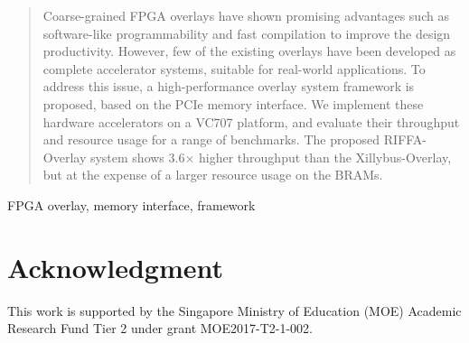 \documentclass[conference]{IEEEtran}
\begin{document}
\begin{abstract}
Coarse-grained FPGA overlays have shown promising advantages such as software-like programmability and fast compilation to improve the design productivity. 
However, few of the existing overlays have been developed as complete accelerator systems, suitable for real-world applications. 
To address this issue, a high-performance overlay system framework is proposed, based on the PCIe memory interface. 
We implement these hardware accelerators on a VC707 platform, and evaluate their throughput and resource usage for a range of benchmarks. 
The proposed RIFFA-Overlay system shows 3.6$\times$ higher throughput than the Xillybus-Overlay, but at the expense of a larger resource usage on the BRAMs. 
\end{abstract}

\begin{IEEEkeywords}
FPGA overlay, memory interface, framework
\end{IEEEkeywords}






%


\section*{Acknowledgment}

This work is supported by the Singapore Ministry of Education (MOE) Academic Research Fund Tier 2 under grant MOE2017-T2-1-002.

\def\IEEEbibitemsep{1pt plus 1pt}


\end{document}
